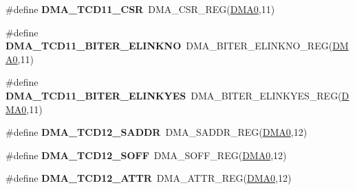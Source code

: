 \begin{DoxyCompactItemize}
\item 
\#define {\bfseries D\+M\+A\+\_\+\+T\+C\+D11\+\_\+\+C\+SR}~D\+M\+A\+\_\+\+C\+S\+R\+\_\+\+R\+EG(\hyperlink{group__DMA__Peripheral__Access__Layer_ga4103044f9ca209772f513dc694513ffb}{D\+M\+A0},11)\hypertarget{group__DMA__Register__Accessor__Macros_ga2d9870d440cbc2d16186f84221454768}{}\label{group__DMA__Register__Accessor__Macros_ga2d9870d440cbc2d16186f84221454768}

\item 
\#define {\bfseries D\+M\+A\+\_\+\+T\+C\+D11\+\_\+\+B\+I\+T\+E\+R\+\_\+\+E\+L\+I\+N\+K\+NO}~D\+M\+A\+\_\+\+B\+I\+T\+E\+R\+\_\+\+E\+L\+I\+N\+K\+N\+O\+\_\+\+R\+EG(\hyperlink{group__DMA__Peripheral__Access__Layer_ga4103044f9ca209772f513dc694513ffb}{D\+M\+A0},11)\hypertarget{group__DMA__Register__Accessor__Macros_ga3663df77de1b0291986ce936d00049e4}{}\label{group__DMA__Register__Accessor__Macros_ga3663df77de1b0291986ce936d00049e4}

\item 
\#define {\bfseries D\+M\+A\+\_\+\+T\+C\+D11\+\_\+\+B\+I\+T\+E\+R\+\_\+\+E\+L\+I\+N\+K\+Y\+ES}~D\+M\+A\+\_\+\+B\+I\+T\+E\+R\+\_\+\+E\+L\+I\+N\+K\+Y\+E\+S\+\_\+\+R\+EG(\hyperlink{group__DMA__Peripheral__Access__Layer_ga4103044f9ca209772f513dc694513ffb}{D\+M\+A0},11)\hypertarget{group__DMA__Register__Accessor__Macros_ga42aed10d8bc9213b5bc04050566cb6dc}{}\label{group__DMA__Register__Accessor__Macros_ga42aed10d8bc9213b5bc04050566cb6dc}

\item 
\#define {\bfseries D\+M\+A\+\_\+\+T\+C\+D12\+\_\+\+S\+A\+D\+DR}~D\+M\+A\+\_\+\+S\+A\+D\+D\+R\+\_\+\+R\+EG(\hyperlink{group__DMA__Peripheral__Access__Layer_ga4103044f9ca209772f513dc694513ffb}{D\+M\+A0},12)\hypertarget{group__DMA__Register__Accessor__Macros_ga4dd8efb3586fceb233373ef3d8ed7eed}{}\label{group__DMA__Register__Accessor__Macros_ga4dd8efb3586fceb233373ef3d8ed7eed}

\item 
\#define {\bfseries D\+M\+A\+\_\+\+T\+C\+D12\+\_\+\+S\+O\+FF}~D\+M\+A\+\_\+\+S\+O\+F\+F\+\_\+\+R\+EG(\hyperlink{group__DMA__Peripheral__Access__Layer_ga4103044f9ca209772f513dc694513ffb}{D\+M\+A0},12)\hypertarget{group__DMA__Register__Accessor__Macros_ga011e8c68fffc17fe021a2642a0576241}{}\label{group__DMA__Register__Accessor__Macros_ga011e8c68fffc17fe021a2642a0576241}

\item 
\#define {\bfseries D\+M\+A\+\_\+\+T\+C\+D12\+\_\+\+A\+T\+TR}~D\+M\+A\+\_\+\+A\+T\+T\+R\+\_\+\+R\+EG(\hyperlink{group__DMA__Peripheral__Access__Layer_ga4103044f9ca209772f513dc694513ffb}{D\+M\+A0},12)\hypertarget{group__DMA__Register__Accessor__Macros_ga2a74898e8e99ad24eb0d62aa541d809b}{}\label{group__DMA__Register__Accessor__Macros_ga2a74898e8e99ad24eb0d62aa541d809b}


\end{DoxyCompactItemize}
